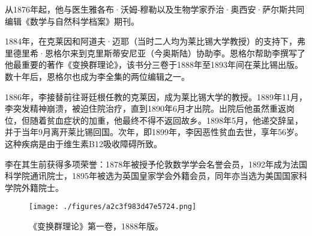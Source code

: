 从1876年起，他与医生雅各布·沃姆-穆勒以及生物学家乔治·奥西安·萨尔斯共同编辑《数学与自然科学档案》期刊。

1884年，在克莱因和阿道夫·迈耶（当时二人均为莱比锡大学教授）的支持下，弗里德里希·恩格尔来到克里斯蒂安尼亚（今奥斯陆）协助李。恩格尔帮助李撰写了他最重要的著作《变换群理论》，该书分三卷于1888年至1893年间在莱比锡出版。数十年后，恩格尔也成为李全集的两位编辑之一。

1886年，李接替前往哥廷根任教的克莱因，成为莱比锡大学的教授。1889年11月，李突发精神崩溃，被迫住院治疗，直到1890年6月才出院。出院后他虽然重返岗位，但随着贫血症状的加重，他最终不得不返回故乡。1898年5月，他递交辞呈，并于当年9月离开莱比锡回国。次年，即1899年，李因恶性贫血去世，享年56岁。这种疾病是由于维生素B12吸收障碍所致。

李在其生前获得多项荣誉：1878年被授予伦敦数学学会名誉会员，1892年成为法国科学院通讯院士，1895年被选为英国皇家学会外籍会员，同年亦当选为美国国家科学院外籍院士。
\begin{figure}[ht]
\centering
\texttt{[image: ./figures/a2c3f983d47e5724.png]}
\caption{《变换群理论》第一卷，1888年版。} \label{fig_SFSL_2}
\end{figure}